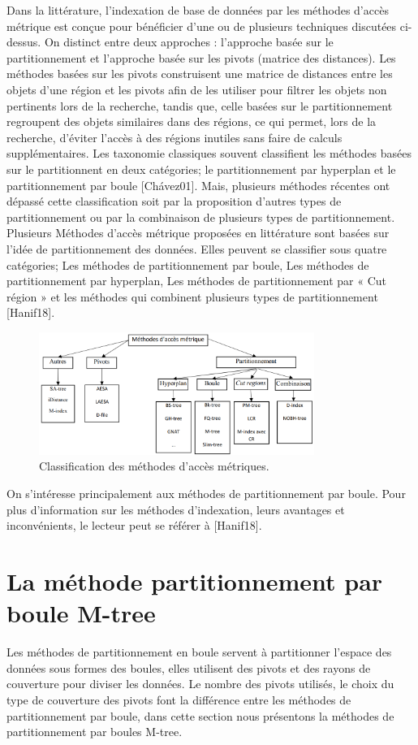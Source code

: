 Dans la littérature, l’indexation de base de données par les méthodes d’accès métrique est conçue pour bénéficier d’une ou de plusieurs techniques discutées ci-dessus. On distinct entre deux approches : l’approche basée sur le partitionnement et l’approche basée sur les pivots (matrice des distances). Les méthodes basées sur les pivots construisent une matrice de distances entre les objets d’une région et les pivots afin de les utiliser pour filtrer les objets non pertinents lors de la recherche, tandis que, celle basées sur le partitionnement regroupent des objets similaires dans des régions, ce qui permet, lors de la recherche, d’éviter l’accès à des régions inutiles sans faire de calculs supplémentaires. Les taxonomie classiques souvent classifient les méthodes basées sur le partitionnent en deux catégories; le partitionnement par hyperplan et le partitionnement par boule [Chávez01]. Mais, plusieurs méthodes récentes ont dépassé cette classification soit par la proposition d’autres types de partitionnement ou par la combinaison de plusieurs types de partitionnement. \\

Plusieurs Méthodes d’accès métrique proposées en littérature sont basées sur l’idée de partitionnement des données. Elles peuvent se classifier sous quatre catégories; Les méthodes de partitionnement par boule, Les méthodes de partitionnement par hyperplan, Les méthodes de partitionnement par « Cut région » et les méthodes qui combinent plusieurs types de partitionnement [Hanif18].
\begin{figure}[H]
	\centering
	\includegraphics[width=0.8\textwidth]{Figures/class.png} %
	\caption{ Classification des méthodes d’accès métriques.}
\end{figure}
On s'intéresse principalement aux méthodes de partitionnement par boule.
Pour plus d'information sur les méthodes d'indexation, leurs avantages et inconvénients, le lecteur peut se référer à [Hanif18].
\section{La méthode partitionnement par boule M-tree}
Les méthodes de partitionnement en boule servent à partitionner l'espace des données sous formes des boules, elles utilisent des pivots et des rayons de couverture pour diviser les données. Le nombre des pivots utilisés, le choix du type de couverture des pivots font la différence entre les méthodes de partitionnement par boule, dans cette section nous présentons la méthodes de partitionnement par boules M-tree.

